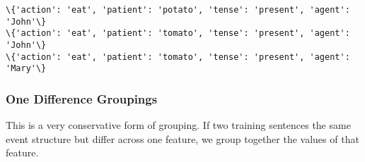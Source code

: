 \documentclass[11pt]{article}
\begin{document}
    \begin{Verbatim}[commandchars=\\\{\}]
\{'action': 'eat', 'patient': 'potato', 'tense': 'present', 'agent': 'John'\}
\{'action': 'eat', 'patient': 'tomato', 'tense': 'present', 'agent': 'John'\}
\{'action': 'eat', 'patient': 'tomato', 'tense': 'present', 'agent': 'Mary'\}

    \end{Verbatim}

    \hypertarget{one-difference-groupings}{%
\subsubsection{One Difference
Groupings}\label{one-difference-groupings}}

This is a very conservative form of grouping. If two training sentences
the same event structure but differ across one feature, we group
together the values of that feature.
\end{document}
